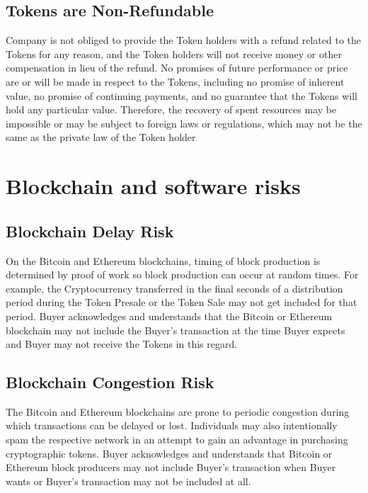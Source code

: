 \documentclass[12pt]{report}
\begin{document}
\subsection{Tokens are Non-Refundable}
\label{risks-value-non-refundable}
Company is not obliged to provide the Token holders with a refund related to the Tokens for any reason, and the Token holders will not receive money or other compensation in lieu of the refund. No promises of future performance or price are or will be made in respect to the Tokens, including no promise of inherent value, no promise of continuing payments, and no guarantee that the Tokens will hold any particular value. Therefore, the recovery of spent resources may be impossible or may be subject to foreign laws or regulations, which may not be the same as the private law of the Token holder

\section{Blockchain and software risks}
\label{risks-block}

\subsection{Blockchain Delay Risk}
\label{risks-block-delay}
On the Bitcoin and Ethereum blockchains, timing of block production is determined by proof of work so block production can occur at random times. For example, the Cryptocurrency transferred in the final seconds of a distribution period during the Token Presale or the Token Sale may not get included for that period. Buyer acknowledges and understands that the Bitcoin or Ethereum blockchain may not include the Buyer’s transaction at the time Buyer expects and Buyer may not receive the Tokens in this regard.

\subsection{Blockchain Congestion Risk}
\label{risks-block-congestion}
The Bitcoin and Ethereum blockchains are prone to periodic congestion during which transactions can be delayed or lost. Individuals may also intentionally spam the respective network in an attempt to gain an advantage in purchasing cryptographic tokens. Buyer acknowledges and understands that Bitcoin or Ethereum block producers may not include Buyer’s transaction when Buyer wants or Buyer’s transaction may not be included at all.
\end{document}
